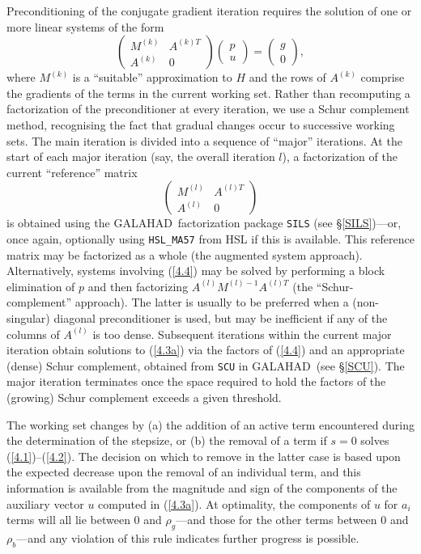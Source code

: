 \documentclass[acmtocl,acmnow]{acmtrans2m}
\newcommand{\req}[1]{(\ref{#1})}
\newcommand{\gal}{{\sf GALAHAD}}
\newcommand{\eqn}[2]{\begin{equation}\label{#1}{#2}\end{equation}}
\newcommand{\vect}[1]{\left(\begin{array}{c}#1\end{array}\right)}
\newcommand{\mat}[2]{\left(\begin{array}{#1}#2\end{array}\right)}
\begin{document}
Preconditioning of the conjugate gradient iteration
requires the solution of one or more linear systems of the form
\eqn{4.3a}{\mat{cc}{M^{(k)} & A^{(k)T} \\ A^{(k)} & 0 }
\vect{ p \\ u} = \vect{ g \\ 0 },}
where $M^{(k)}$ is a ``suitable'' approximation to $H$
and the rows of $A^{(k)}$ comprise the gradients of the
terms in the current working set. Rather than recomputing a
factorization of the preconditioner at every iteration, we use a
Schur complement method, recognising the fact that
gradual changes occur to successive working sets. The main
iteration is divided into a sequence of ``major'' iterations.
At the start of each major iteration (say, the overall iteration $l$),
a factorization of the
current ``reference'' matrix
\eqn{4.4}{\mat{cc}{M^{(l)} & A^{(l)T} \\ A^{(l)} & 0 }}
is obtained using  the \gal\ factorization package
{\tt SILS} (see \S\ref{SILS})---or, once again,
optionally using {\tt HSL\_MA57} from HSL if this is available.
This reference matrix may be factorized as a whole (the
augmented system approach). Alternatively, systems involving \req{4.4} may
be solved by performing a block elimination of $p$
and then factorizing $A^{(l)} M^{(l)-1} A^{(l)T}$
(the ``Schur-complement'' approach). The latter is usually to be preferred
when a (non-singular) diagonal
preconditioner is used, but may be inefficient if any of the columns
of $A^{(l)}$ is too dense.
Subsequent iterations within the current major
iteration obtain solutions to \req{4.3a} via the factors of \req{4.4}
and an appropriate (dense) Schur complement,
obtained from {\tt SCU} in \gal\ (see \S\ref{SCU}).
The major iteration terminates
once the space required to hold the factors of the (growing) Schur
complement exceeds a given threshold.

The working set changes by (a)
the addition of an active term encountered during
the determination of the stepsize, or (b) the removal of a term if $s = 0$
solves \req{4.1}--\req{4.2}. The  decision on which to remove in the latter
case is based upon the expected decrease upon the removal of an individual term,
and this information is available from the magnitude and sign of the components
of the auxiliary vector $u$ computed in \req{4.3a}. At optimality, the
components of $u$ for $a_i$ terms will all lie between
$0$ and $\rho_g$---and those for the other terms
between $0$ and $\rho_b$---and any violation
of this rule indicates further progress is possible.
\end{document}
